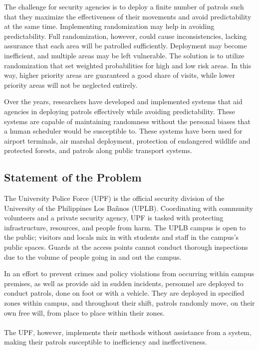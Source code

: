 \documentclass[journal]{./IEEE/IEEEtran}
\begin{document}
The challenge for security agencies is to deploy a finite number of patrols such that they maximize the effectiveness of their movements and avoid predictability at the same time. Implementing randomization may help in avoiding predictability. Full randomization, however, could cause inconsistencies, lacking assurance that each area will be patrolled sufficiently. Deployment may become inefficient, and multiple areas may be left vulnerable. The solution is to utilize randomization that set weighted probabilities for high and low risk areas. In this way, higher priority areas are guaranteed a good share of visits, while lower priority areas will not be neglected entirely.

Over the years, researchers have developed and implemented systems that aid agencies in deploying patrols effectively while avoiding predictability. These systems are capable of maintaining randomness without the personal biases that a human scheduler would be susceptible to. These systems have been used for airport terminals, air marshal deployment, protection of endangered wildlife and protected forests, and patrols along public transport systems.

\subsection{Statement of the Problem}
The University Police Force (UPF) is the official security division of the University of the Philippines Los Ba\~{n}nos (UPLB). Coordinating with community volunteers and a private security agency, UPF is tasked with protecting infrastructure, resources, and people from harm. The UPLB campus is open to the public; visitors and locals mix in with students and staff in the campus's public spaces. Guards at the access points cannot conduct thorough inspections due to the volume of people going in and out the campus.

In an effort to prevent crimes and policy violations from occurring within campus premises, as well as provide aid in sudden incidents, personnel are deployed to conduct patrols, done on foot or with a vehicle. They are deployed in specified zones within campus, and throughout their shift, patrols randomly move, on their own free will, from place to place within their zones. \\\\

The UPF, however, implements their methods without assistance from a system, making their patrols susceptible to inefficiency and ineffectiveness.
\end{document}
